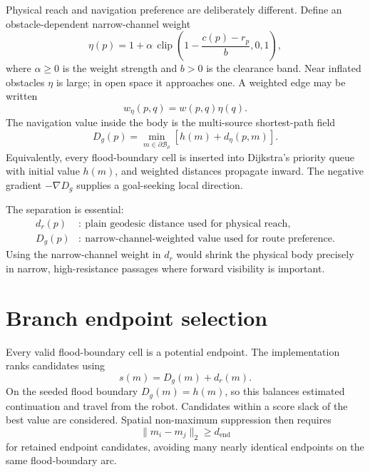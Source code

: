 \documentclass[11pt,a4paper]{article}
\newcommand{\B}{\mathcal{B}}
\newcommand{\clip}{\operatorname{clip}}
\begin{document}
Physical reach and navigation preference are deliberately different. Define
an obstacle-dependent narrow-channel weight
\begin{equation}
  \eta(p)=1+\alpha\,
  \clip\left(
  1-\frac{c(p)-r_p}{b},0,1
  \right),
  \label{eq:viscosity}
\end{equation}
where $\alpha\geq0$ is the weight strength and $b>0$ is the clearance band.
Near inflated obstacles $\eta$ is large; in open space it approaches one.
A weighted edge may be written
\begin{equation}
  w_\eta(p,q)=w(p,q)\eta(q).
\end{equation}
The navigation value inside the body is the multi-source shortest-path field
\begin{equation}
  \boxed{
  D_g(p)=
  \min_{m\in\partial\B_\rho}
  \left[
  h(m)+d_\eta(p,m)
  \right].
  }
  \label{eq:navigation-field}
\end{equation}
Equivalently, every flood-boundary cell is inserted into Dijkstra's priority queue
with initial value $h(m)$, and weighted distances propagate inward.
The negative gradient $-\nabla D_g$ supplies a goal-seeking local direction.

The separation is essential:
\begin{align}
  d_r(p)&:\ \text{plain geodesic distance used for physical reach},\\
  D_g(p)&:\ \text{narrow-channel-weighted value used for route preference}.
\end{align}
Using the narrow-channel weight in $d_r$ would shrink the physical body
precisely in narrow, high-resistance passages where forward visibility is
important.

\section{Branch endpoint selection}

Every valid flood-boundary cell is a potential endpoint. The implementation ranks
candidates using
\begin{equation}
  s(m)=D_g(m)+d_r(m).
  \label{eq:branch-score}
\end{equation}
On the seeded flood boundary $D_g(m)=h(m)$, so this balances estimated continuation
and travel from the robot. Candidates within a score slack of the best value
are considered. Spatial non-maximum suppression then requires
\begin{equation}
  \lVert m_i-m_j\rVert_2\geq d_{\mathrm{end}}
\end{equation}
for retained endpoint candidates, avoiding many nearly identical endpoints
on the same flood-boundary arc.
\end{document}
